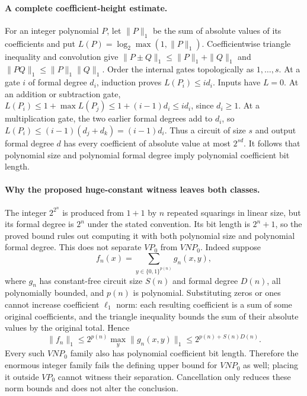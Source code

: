 \documentclass[11pt]{article}
\begin{document}
\paragraph{A complete coefficient-height estimate.}
For an integer polynomial $P$, let $\|P\|_1$ be the sum of absolute values
of its coefficients and put $L(P)=\log_2\max(1,\|P\|_1)$.
Coefficientwise triangle inequality and convolution give
$\|P\pm Q\|_1\le\|P\|_1+\|Q\|_1$ and
$\|PQ\|_1\le\|P\|_1\|Q\|_1$.
Order the internal gates topologically as $1,\ldots,s$. At a gate $i$ of
formal degree $d_i$, induction proves $L(P_i)\le i d_i$.
Inputs have $L=0$. At an addition or subtraction gate,
$L(P_i)\le1+\max L(P_j)\le1+(i-1)d_i\le i d_i$, since $d_i\ge1$.
At a multiplication gate, the two earlier formal degrees add to $d_i$, so
$L(P_i)\le(i-1)(d_j+d_k)=(i-1)d_i$.
Thus a circuit of size $s$ and output formal degree $d$ has every coefficient
of absolute value at most $2^{sd}$. It follows that polynomial size and
polynomial formal degree imply polynomial coefficient bit length.

\paragraph{Why the proposed huge-constant witness leaves both classes.}
The integer $2^{2^n}$ is produced from $1+1$ by $n$ repeated squarings in
linear size, but its formal degree is $2^n$ under the stated convention.
Its bit length is $2^n+1$, so the proved bound rules out computing it with
both polynomial size and polynomial formal degree.
This does not separate $VP_0$ from $VNP_0$. Indeed suppose
\[
f_n(x)=\sum_{y\in\{0,1\}^{p(n)}}g_n(x,y),
\]
where $g_n$ has constant-free circuit size $S(n)$ and formal degree $D(n)$,
all polynomially bounded, and $p(n)$ is polynomial. Substituting zeros or ones
cannot increase coefficient $\ell_1$ norm: each resulting coefficient is a
sum of some original coefficients, and the triangle inequality bounds the sum
of their absolute values by the original total. Hence
\[
\|f_n\|_1\le2^{p(n)}\max_y\|g_n(x,y)\|_1
\le2^{p(n)+S(n)D(n)}.
\]
Every such $VNP_0$ family also has polynomial coefficient bit length.
Therefore the enormous integer family fails the defining upper bound for
$VNP_0$ as well; placing it outside $VP_0$ cannot witness their separation.
Cancellation only reduces these norm bounds and does not alter the conclusion.
\end{document}
